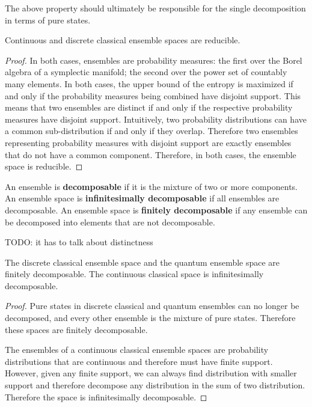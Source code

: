 \begin{remark}
	The above property should ultimately be responsible for the single decomposition in terms of pure states.
\end{remark}

\begin{prop}
	Continuous and discrete classical ensemble spaces are reducible.
\end{prop}

\begin{proof}
	In both cases, ensembles are probability measures: the first over the Borel algebra of a symplectic manifold; the second over the power set of countably many elements. In both cases, the upper bound of the entropy is maximized if and only if the probability measures being combined have disjoint support. This means that two ensembles are distinct if and only if the respective probability measures have disjoint support. Intuitively, two probability distributions can have a common sub-distribution if and only if they overlap. Therefore two ensembles representing probability measures with disjoint support are exactly ensembles that do not have a common component. Therefore, in both cases, the ensemble space is reducible.
\end{proof}

\begin{defn}
	An ensemble is \textbf{decomposable} if it is the mixture of two or more components. An ensemble space is \textbf{infinitesimally decomposable} if all ensembles are decomposable. An ensemble space is \textbf{finitely decomposable} if any ensemble can be decomposed into elements that are not decomposable.
	
	TODO: it has to talk about distinctness
\end{defn}

\begin{prop}
	The discrete classical ensemble space and the quantum ensemble space are finitely decomposable. The continuous classical space is infinitesimally decomposable.
\end{prop}

\begin{proof}
	Pure states in discrete classical and quantum ensembles can no longer be decomposed, and every other ensemble is the mixture of pure states. Therefore these spaces are finitely decomposable.
	
	The ensembles of a continuous classical ensemble spaces are probability distributions that are continuous and therefore must have finite support. However, given any finite support, we can always find distribution with smaller support and therefore decompose any distribution in the sum of two distribution. Therefore the space is infinitesimally decomposable.
\end{proof}


